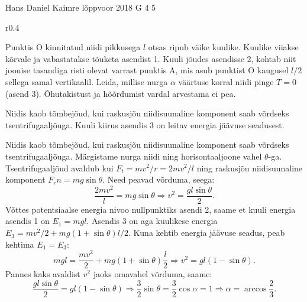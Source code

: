 {Hans Daniel Kaimre} %
{lõppvoor} %
{2018} %
{G 4} %
{5} %
{
\ifStatement
\begin{wrapfigure}[10]{r}{0.4\textwidth}
\vspace{-5pt}
\end{wrapfigure}

Punktis O kinnitatud niidi pikkusega $l$ otsas ripub väike kuulike. Kuulike viiakse kõrvale ja vabastatakse tõuketa asendist 1. Kuuli jõudes asendisse 2, kohtab niit joonise tasandiga risti olevat varrast punktis A, mis asub punktist O kaugusel $l/2$ sellega samal vertikaalil. Leida, millise nurga $\alpha$ väärtuse korral niidi pinge $T=0$ (asend 3). Õhutakistust ja hõõrdumist vardal arvestama ei pea.
\fi


\ifHint
Niidis kaob tõmbejõud, kui raskusjõu niidisuunaline komponent saab võrdseks tsentrifugaaljõuga. Kuuli kiirus asendis 3 on leitav energia jäävuse seadusest.
\fi


\ifSolution
Niidis kaob tõmbejõud, kui raskusjõu niidisuunaline komponent saab võrdseks tsentrifugaaljõuga. Märgistame nurga niidi ning horisontaaljoone vahel $\theta$-ga. Tsentrifugaaljõud avaldub kui $F_t=mv^2/r=2mv^2/l$ ning raskusjõu niidisuunaline komponent $F_rn=mg\sin\theta$. Need peavad võrduma, seega:
$$\frac{2mv^2}{l}=mg\sin\theta \Rightarrow v^2=\frac{gl\sin\theta}{2}.$$
Võttes potentsiaalse energia nivoo nullpunktiks asendi 2, saame et kuuli energia asendis 1 on $E_1=mgl$. Asendis 3 on aga kuulikese energia $E_3=mv^2/2+mg(1+\sin\theta)l/2$. Kuna kehtib energia jäävuse seadus, peab kehtima $E_1=E_3$:
$$mgl=\frac{mv^2}{2}+mg(1+\sin\theta)\frac{l}{2} \Rightarrow v^2=gl(1-\sin\theta).$$
Pannes kaks avaldist $v^2$ jaoks omavahel võrduma, saame:
$$\frac{gl\sin\theta}{2}=gl(1-\sin\theta)\Rightarrow \frac{3}{2}\sin\theta=\frac{3}{2}\cos\alpha=1 \Rightarrow \alpha=\arccos\frac{2}{3}.$$
\fi


}
